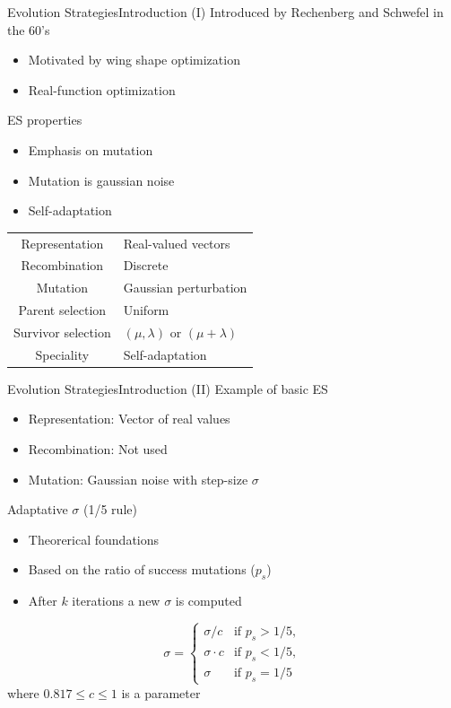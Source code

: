 \documentclass[10pt,compress]{beamer} %
\begin{document}
\begin{frame}{Evolution Strategies}{Introduction (I)}
	Introduced by Rechenberg and Schwefel in the 60's
	\begin{itemize}
		\item Motivated by wing shape optimization
		\item Real-function optimization
	\end{itemize}
	ES properties
	\begin{itemize}
		\item Emphasis on mutation
		\item Mutation is gaussian noise
		\item Self-adaptation
	\end{itemize}
	\small{
	\begin{table}
	\centering
	\begin{tabular}{|c|l|} \hline 
	Representation		& Real-valued vectors	\\
	Recombination		& Discrete		\\
	Mutation			& Gaussian perturbation	\\
	Parent selection	& Uniform			\\
	Survivor selection 	& $(\mu,\lambda)$ or $(\mu+\lambda)$\\
	Speciality			& Self-adaptation\\
	\hline\end{tabular}
	\end{table}
	}
\end{frame}

\begin{frame}{Evolution Strategies}{Introduction (II)}
	Example of basic ES
	\begin{itemize}
		\item Representation: Vector of real values
		\item Recombination: Not used
		\item Mutation: Gaussian noise with \alert{step-size} $\sigma$
	\end{itemize}
	Adaptative $\sigma$ (\alert{1/5 rule})
	\begin{itemize}
		\item Theorerical foundations
		\item Based on the ratio of success mutations ($p_s$)
		\item After $k$ iterations a new $\sigma$ is computed
	\end{itemize}
	\begin{equation*}
 \sigma = 
   \begin{cases} 
      \sigma/c 		& \text{if } p_s > 1/5, \\
	  \sigma \cdot c & \text{if } p_s < 1/5, \\
	  \sigma		& \text{if } p_s = 1/5
	\end{cases}
	\end{equation*}
	where $0.817 \le c \le 1$ is a parameter
\end{frame}
\end{document}
